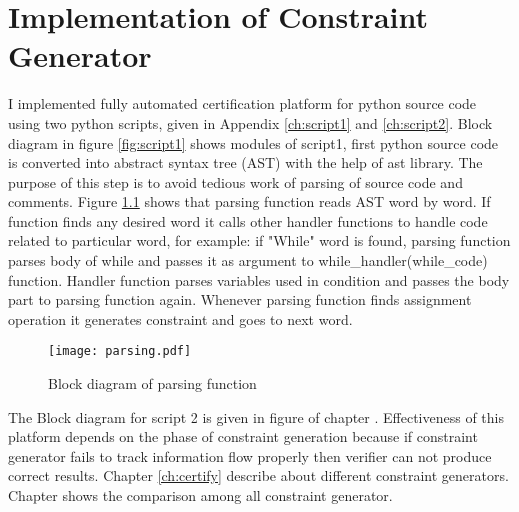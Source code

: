 \chapter{Implementation of Constraint Generator}
I implemented fully automated certification platform for python source code  using two python scripts, given in Appendix \ref{ch:script1} and \ref{ch:script2}. Block diagram in figure \ref{fig:script1} shows modules of script1, first python source code is converted into abstract syntax tree (AST) with the help of ast library. The purpose of this step is to avoid tedious work of parsing of source code and comments. Figure \ref{fig:parsing} shows that parsing function reads AST word by word. If function finds any desired word it calls other handler functions to handle code related to particular word, for example: if "While" word is found, parsing function parses body of while and passes it as argument to while\_handler(while\_code) function. Handler function parses variables used in condition and passes the body part to parsing function again. Whenever parsing function finds assignment operation it generates constraint and goes to next word.     
\begin{figure}
	\texttt{[image: parsing.pdf]}
	\centering
	\caption{Block diagram of parsing function}
	\label{fig:parsing}
\end{figure}
	The Block diagram for script 2 is given in figure  of chapter . 
	Effectiveness of this platform depends on the phase of constraint generation because if constraint generator fails to track information flow properly then verifier can not produce correct results. Chapter \ref{ch:certify} describe about different constraint generators. Chapter  shows the comparison among all constraint generator.  